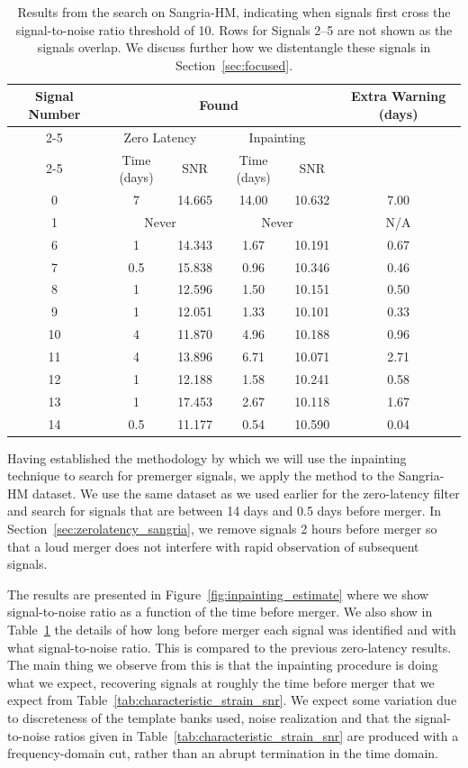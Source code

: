 \documentclass[%
 reprint,
superscriptaddress,
 nofootinbib,
 amsmath,amssymb,
 aps,
 prd,
]{revtex4-2}
\begin{document}
\begin{table}[tbp]
        \centering
\begin{tabular}{|c|cc|cc|c|}
\hline
\multirow{3}{*}{Signal Number} & \multicolumn{4}{c|}{Found} & \multirow{3}{*}{Extra Warning (days)} \\
\cline{2-5}
& \multicolumn{2}{c|}{Zero Latency} & \multicolumn{2}{c|}{Inpainting} & \\
\cline{2-5}
 & Time (days)  & SNR & Time (days)  & SNR & \\
\hline
0 & 7 &   14.665 & 14.00 &  10.632 & 7.00 \\
1 & \multicolumn{2}{c|}{Never}    & \multicolumn{2}{c|}{Never}   & N/A \\
6 & 1 &   14.343 & 1.67 &  10.191 & 0.67 \\
7 & 0.5 &   15.838 & 0.96 &  10.346 & 0.46 \\
8 & 1 &   12.596 & 1.50 &  10.151 & 0.50 \\
9 & 1 &   12.051 & 1.33 &  10.101 & 0.33 \\
10 & 4 &   11.870 & 4.96 &  10.188 & 0.96 \\
11 & 4 &   13.896 & 6.71 &  10.071 & 2.71 \\
12 & 1 &   12.188 & 1.58 &  10.241 & 0.58 \\
13 & 1 &   17.453 & 2.67 &  10.118 & 1.67 \\
14 & 0.5 &   11.177 & 0.54 &  10.590 & 0.04 \\
\hline
\end{tabular}
        \caption{
            Results from the search on Sangria-HM, indicating when signals first cross the signal-to-noise ratio threshold of 10.
            Rows for Signals 2--5 are not shown as the signals overlap.
            We discuss further how we distentangle these signals in Section~\ref{sec:focused}.
        }
        \label{tab:when_found}
\end{table}

Having established the methodology by which we will use the inpainting technique to search for premerger signals, we apply the method to the Sangria-HM dataset.
We use the same dataset as we used earlier for the zero-latency filter and search for signals that are between 14 days and 0.5 days before merger.
In Section~\ref{sec:zerolatency_sangria}, we remove signals 2 hours before merger so that a loud merger does not interfere with rapid observation of subsequent signals.

The results are presented in Figure~\ref{fig:inpainting_estimate} where we show signal-to-noise ratio as a function of the time before merger.
We also show in Table~\ref{tab:when_found} the details of how long before merger each signal was identified and with what signal-to-noise ratio.
This is compared to the previous zero-latency results.
The main thing we observe from this is that the inpainting procedure is doing what we expect, recovering signals at roughly the time before merger that we expect from Table~\ref{tab:characteristic_strain_snr}.
We expect some variation due to discreteness of the template banks used, noise realization and that the signal-to-noise ratios given in Table~\ref{tab:characteristic_strain_snr} are produced with a frequency-domain cut, rather than an abrupt termination in the time domain. 
\end{document}
